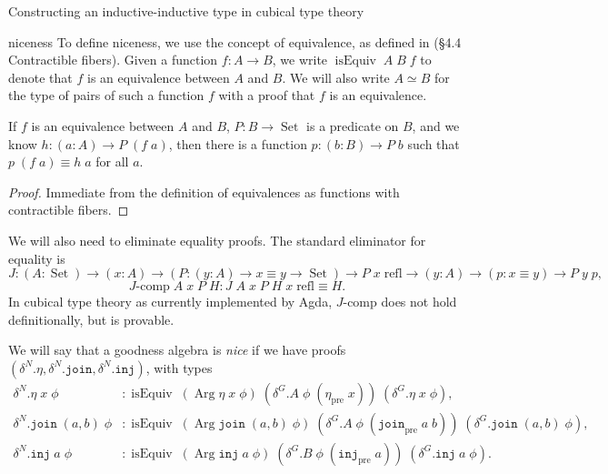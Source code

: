 \documentclass[acmsmall,review]{acmart}\settopmatter{printfolios=true,printccs=false,printacmref=false}
\DeclareMathOperator{\USet}{Set}
\DeclareMathOperator{\isEquiv}{isEquiv}
\DeclareMathOperator{\Arg}{Arg}
\newcommand{\pre}[1]{{#1}_\text{pre}}
\newcommand{\Id}[2]{{#1}\equiv{#2}}
\newcommand{\join}{\texttt{join}}
\newcommand{\inj}{\texttt{inj}}
\begin{document}
\begin{section}{Constructing an inductive-inductive type in cubical type theory}
\begin{subsection}{niceness}
To define niceness, we use the concept of equivalence, as defined in \citet{hottbook} (\S4.4 Contractible fibers). Given a function $f : A \to B$, we write $\isEquiv\;A\;B\;f$ to denote that $f$ is an equivalence between $A$ and $B$. We will also write $A \simeq B$ for the type of pairs of such a function $f$ with a proof that $f$ is an equivalence.
\begin{lemma}
    If $f$ is an equivalence between $A$ and $B$, $P : B \to \USet$ is a predicate on $B$, and we know $h : (a : A) \to P\;(f\;a)$, then there is a function $p : (b : B) \to P\;b$ such that $\Id{p\;(f\;a)}{h\;a}$ for all $a$.
\end{lemma}
\begin{proof}
    Immediate from the definition of equivalences as functions with contractible fibers.
\end{proof}

We will also need to eliminate equality proofs. The standard eliminator for equality is \[J : (A : \USet) \to (x : A) \to (P : (y : A) \to \Id{x}{y} \to \USet) \to P\;x\;\text{refl} \to (y : A) \to (p : \Id{x}{y}) \to P\;y\;p,\]\[J\text{-comp}\;A\;x\;P\;H : \Id{J\;A\;x\;P\;H\;x\;\text{refl}}{H}.\] In cubical type theory as currently implemented by Agda, $J\text{-comp}$ does not hold definitionally, but is provable.

We will say that a goodness algebra is \emph{nice} if we have proofs $(\delta^N.\eta, \delta^N.\join, \delta^N.\inj)$, with types \begin{align*}
\delta^N.\eta\;x\;\phi &: \isEquiv\;(\Arg \eta \;x\;\phi)\; (\delta^G.A\;\phi\;(\pre{\eta}\;x))\;(\delta^G.\eta\;x\;\phi),\\
\delta^N.\join\;(a, b)\;\phi &: \isEquiv\;(\Arg\join\;(a, b)\;\phi)\;(\delta^G.A\;\phi\;(\pre{\join}\;a\;b))\;(\delta^G.\join\;(a, b)\;\phi),\\
\delta^N.\inj\;a\;\phi &: \isEquiv\;(\Arg\inj\;a\;\phi)\;(\delta^G.B\;\phi\;(\pre{\inj}\;a))\;(\delta^G.\inj\;a\;\phi).
\end{align*}


\end{subsection}
\end{section}
\end{document}
